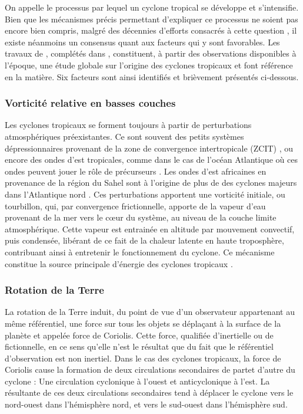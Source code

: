 \documentclass[../main.tex]{subfiles}
\begin{document}
On appelle  le processus par lequel un cyclone tropical se développe et s'intensifie. Bien que les mécanismes précis permettant
d'expliquer ce processus ne soient pas encore bien compris, malgré des décennies d'efforts consacrés à cette question \parencite{yanai_formation_1964, gray_global_1968, 
montgomery_tropical_1993, gray_formation_1998, tory_tropical_2010}, il existe néanmoins un consensus quant aux facteurs qui y sont favorables. Les travaux de
\cite{gray_global_1968}, complétés dans \cite{gray_tropical_1975}, constituent, à partir des observations disponibles à l'époque, une étude globale sur
l'origine des cyclones tropicaux et font référence en la matière. Six facteurs sont ainsi identifiés et brièvement présentés ci-dessous.

\subsubsection*{Vorticité relative en basses couches}

Les cyclones tropicaux se forment toujours à partir de perturbations atmosphériques préexistantes. Ce sont souvent des petits systèmes dépressionnaires
provenant de la zone de convergence intertropicale (ZCIT) \parencite{gray_global_1968}, ou encore des ondes d'est tropicales, comme dans le cas de l'océan
Atlantique où ces ondes peuvent jouer le rôle de précurseurs \parencite{thorncroft_african_2001,patricola_response_2018}. Les ondes d'est africaines en provenance
de la région du Sahel sont à l'origine de plus de  des cyclones majeurs dans l'Atlantique nord \parencite{landsea_strong_1992}. Ces perturbations apportent
une vorticité initiale, ou tourbillon, qui, par convergence frictionnelle, apporte de la vapeur d'eau provenant de la mer vers le cœur du système, au niveau de la
couche limite atmosphérique. Cette vapeur est entrainée en altitude par mouvement convectif, puis condensée, libérant de ce fait de la chaleur latente en haute
troposphère, contribuant ainsi à entretenir le fonctionnement du cyclone. Ce mécanisme constitue la source principale d'énergie des cyclones tropicaux
\parencite{emanuel_dependence_1987}.

\subsubsection*{Rotation de la Terre}

La rotation de la Terre induit, du point de vue d'un observateur appartenant au même référentiel, une force sur tous les objets se déplaçant à la surface de la
planète et appelée force de Coriolis. Cette force, qualifiée d'inertielle ou de fictionnelle, en ce sens qu'elle n'est le résultat que du fait que le
référentiel d'observation est non inertiel. Dans le cas des cyclones tropicaux, la force de Coriolis cause la formation de deux circulations secondaires de partet d'autre du cyclone : Une circulation cyclonique à l'ouest et anticyclonique à l'est. La résultante de ces deux circulations secondaires tend à déplacer le cyclone vers le nord-ouest dans l'hémisphère nord, et vers le sud-ouest dans l'hémisphère sud.
\end{document}
